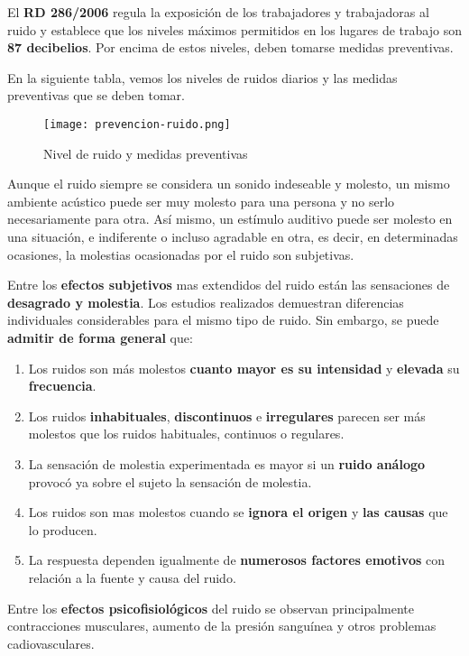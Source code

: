 El \textbf{RD 286/2006} regula la exposición de los trabajadores y trabajadoras al ruido y establece que los niveles máximos permitidos en los lugares de trabajo son \textbf{87 decibelios}. Por encima de estos niveles, deben tomarse medidas preventivas.

En la siguiente tabla, vemos los niveles de ruidos diarios y las medidas preventivas que se deben tomar.

\begin{figure}[H]
    \centering
    \texttt{[image: prevencion-ruido.png]}
    \caption{Nivel de ruido y medidas preventivas}
\end{figure}

Aunque el ruido siempre se considera un sonido indeseable y molesto, un mismo ambiente acústico puede ser muy molesto para una persona y no serlo necesariamente para otra. Así mismo, un estímulo auditivo puede ser molesto en una situación, e indiferente o incluso agradable en otra, es decir, en determinadas ocasiones, la molestias ocasionadas por el ruido son subjetivas.

Entre los \textbf{efectos subjetivos} mas extendidos del ruido están las sensaciones de \textbf{desagrado y molestia}. Los estudios realizados demuestran diferencias individuales considerables para el mismo tipo de ruido. Sin embargo, se puede \textbf{admitir de forma general} que:

\begin{enumerate}
    \item Los ruidos son más molestos \textbf{cuanto mayor es su intensidad} y \textbf{elevada} su \textbf{frecuencia}.
    \item Los ruidos \textbf{inhabituales}, \textbf{discontinuos} e \textbf{irregulares} parecen ser más molestos que los ruidos habituales, continuos o regulares.
    \item La sensación de molestia experimentada es mayor si un \textbf{ruido análogo} provocó ya sobre el sujeto la sensación de molestia.
    \item Los ruidos son mas molestos cuando se \textbf{ignora el origen} y \textbf{las causas} que lo producen.
    \item La respuesta dependen igualmente de \textbf{numerosos factores emotivos} con relación a la fuente y causa del ruido.
\end{enumerate}

Entre los \textbf{efectos psicofisiológicos} del ruido se observan principalmente contracciones musculares, aumento de la presión sanguínea y otros problemas cadiovasculares.

